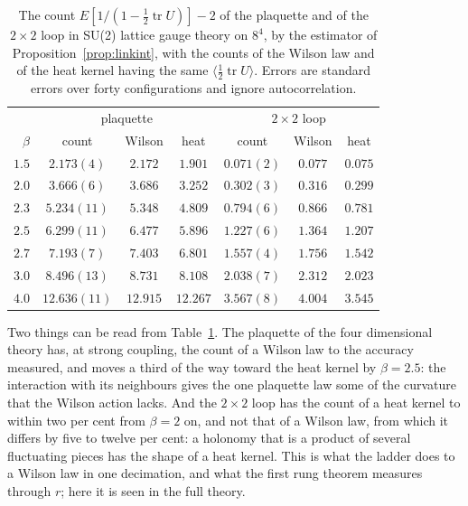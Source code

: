 \begin{table}[t]
\centering\small
\begin{tabular}{rcccccc}
\toprule
 & \multicolumn{3}{c}{plaquette} & \multicolumn{3}{c}{$2\times2$ loop} \\
$\beta$ & count & Wilson & heat & count & Wilson & heat \\ \midrule
$1.5$ & $2.173(4)$ & $2.172$ & $1.901$ & $0.071(2)$ & $0.077$ & $0.075$ \\
$2.0$ & $3.666(6)$ & $3.686$ & $3.252$ & $0.302(3)$ & $0.316$ & $0.299$ \\
$2.3$ & $5.234(11)$ & $5.348$ & $4.809$ & $0.794(6)$ & $0.866$ & $0.781$ \\
$2.5$ & $6.299(11)$ & $6.477$ & $5.896$ & $1.227(6)$ & $1.364$ & $1.207$ \\
$2.7$ & $7.193(7)$ & $7.403$ & $6.801$ & $1.557(4)$ & $1.756$ & $1.542$ \\
$3.0$ & $8.496(13)$ & $8.731$ & $8.108$ & $2.038(7)$ & $2.312$ & $2.023$ \\
$4.0$ & $12.636(11)$ & $12.915$ & $12.267$ & $3.567(8)$ & $4.004$ & $3.545$ \\
\bottomrule
\end{tabular}
\caption[The count on an $8^4$ lattice]{The count $E[1/(1-\frac12\operatorname{tr}U)]-2$ of the plaquette and of the $2\times2$ loop in SU(2) lattice gauge theory on $8^4$, by the estimator of Proposition~\ref{prop:linkint}, with the counts of the Wilson law and of the heat kernel having the same $\langle\frac12\operatorname{tr}U\rangle$. Errors are standard errors over forty configurations and ignore autocorrelation.}
\label{tab:countlattice}
\end{table}

Two things can be read from Table~\ref{tab:countlattice}. The plaquette of the four dimensional theory has, at strong coupling, the count of a Wilson law to the accuracy measured, and moves a third of the way toward the heat kernel by $\beta=2.5$: the interaction with its neighbours gives the one plaquette law some of the curvature that the Wilson action lacks. And the $2\times2$ loop has the count of a heat kernel to within two per cent from $\beta=2$ on, and not that of a Wilson law, from which it differs by five to twelve per cent: a holonomy that is a product of several fluctuating pieces has the shape of a heat kernel. This is what the ladder does to a Wilson law in one decimation, and what the first rung theorem measures through $r$; here it is seen in the full theory.

